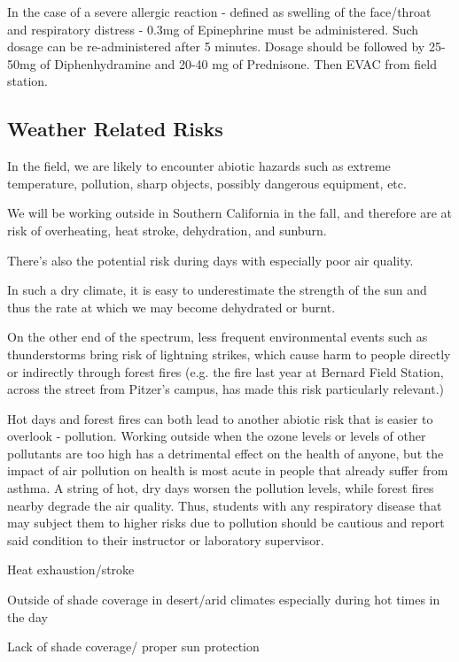 \documentclass[12pt]{../SOP3_beta}
\begin{document}
\NP In the case of a severe allergic reaction - defined as swelling of the face/throat and respiratory distress - 0.3mg of Epinephrine must be administered. Such dosage can be re-administered after 5 minutes. Dosage should be followed by 25-50mg of Diphenhydramine and 20-40 mg of Prednisone. Then EVAC from field station. 

\subsection{Weather Related Risks}

\NP In the field, we are likely to encounter abiotic hazards such as extreme temperature, pollution, sharp objects, possibly dangerous equipment, etc. 

\NP We will be working outside in Southern California in the fall, and therefore are at risk of overheating, heat stroke, dehydration, and sunburn. 

\NP There's also the potential risk during days with especially poor air quality. 

\NP In such a dry climate, it is easy to underestimate the strength of the sun and thus the rate at which we may become dehydrated or burnt.  

\NP On the other end of the spectrum, less frequent environmental events such as thunderstorms bring risk of lightning strikes, which cause harm to people directly or indirectly through forest fires (e.g. the fire last year at Bernard Field Station, across the street from Pitzer's campus, has made this risk particularly relevant.)

\NP Hot days and forest fires can both lead to another abiotic risk that is easier to overlook - pollution. Working outside when the ozone levels or levels of other pollutants are too high has a detrimental effect on the health of anyone, but the impact of air pollution on health is most acute in people that already suffer from asthma. A string of hot, dry days worsen the pollution levels, while forest fires nearby degrade the air quality. Thus, students with any respiratory disease that may subject them to higher risks due to pollution should be cautious and report said condition to their instructor or laboratory supervisor. 

\NP Heat exhaustion/stroke

\NP Outside of shade coverage in desert/arid climates especially during hot times in the day

\NP Lack of shade coverage/ proper sun protection
\end{document}
